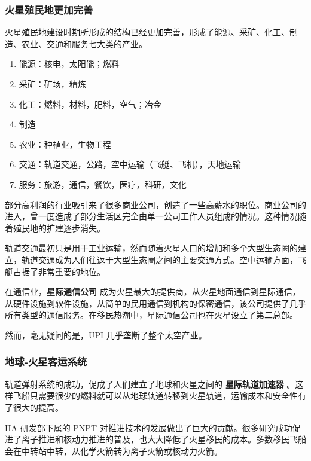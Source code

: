 \documentclass[letterpaper,10pt]{sphinxmanual}
\begin{document}
\subsubsection{火星殖民地更加完善}
\label{history:id31}
火星殖民地建设时期所形成的结构已经更加完善，形成了能源、采矿、化工、制造、农业、交通和服务七大类的产业。
\begin{enumerate}
\item {} 
能源：核电，太阳能；燃料

\item {} 
采矿：矿场，精炼

\item {} 
化工：燃料，材料，肥料，空气；冶金

\item {} 
制造

\item {} 
农业：种植业，生物工程

\item {} 
交通：轨道交通，公路，空中运输（飞艇、飞机），天地运输

\item {} 
服务：旅游，通信，餐饮，医疗，科研，文化

\end{enumerate}

部分高利润的行业吸引来了很多商业公司，创造了一些高薪水的职位。商业公司的进入，曾一度造成了部分生活区完全由单一公司工作人员组成的情况。这种情况随着殖民地的扩建逐步消失。

轨道交通最初只是用于工业运输，然而随着火星人口的增加和多个大型生态圈的建立，轨道交通成为人们往返于大型生态圈之间的主要交通方式。空中运输方面，飞艇占据了非常重要的地位。

在通信业，\textbf{星际通信公司} 成为火星最大的提供商，从火星地面通信到星际通信，从硬件设施到软件设施，从简单的民用通信到机构的保密通信，该公司提供了几乎所有类型的通信服务。在移民热潮中，星际通信公司也在火星设立了第二总部。

然而，毫无疑问的是，UPI 几乎垄断了整个太空产业。


\subsubsection{地球-火星客运系统}
\label{history:id32}
轨道弹射系统的成功，促成了人们建立了地球和火星之间的 \textbf{星际轨道加速器} 。这样飞船只需要很少的燃料就可以从地球轨道转移到火星轨道，运输成本和安全性有了很大的提高。

IIA 研发部下属的 PNPT 对推进技术的发展做出了巨大的贡献。很多研究成功促进了离子推进和核动力推进的普及，也大大降低了火星移民的成本。多数移民飞船会在中转站中转，从化学火箭转为离子火箭或核动力火箭。
\end{document}
